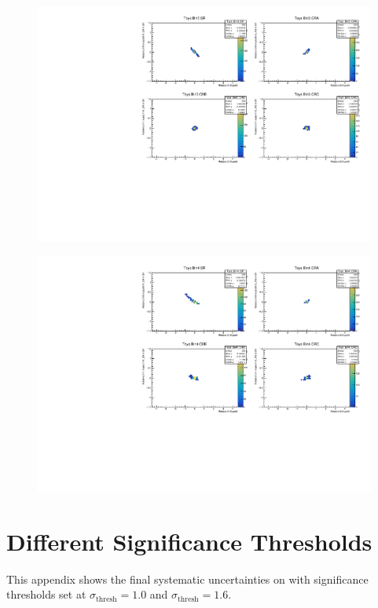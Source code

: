 \begin{figure}[H]
\includegraphics[width=\textwidth]{plots/diffx/instab/linearfx/instabilities_mjj_QCD_Sh2211_Signal_Sh2211_BSMCQCDSTATS_linearfx_newbinning_sherpaasimov_bin3.pdf}
\end{figure}
\begin{figure}[H]
\includegraphics[width=\textwidth]{plots/diffx/instab/linearfx/instabilities_mjj_QCD_Sh2211_Signal_Sh2211_BSMCQCDSTATS_linearfx_newbinning_sherpaasimov_bin4.pdf}
\end{figure}

\section{Different Significance Thresholds\label{sec:appendix:sigthresholds}}
This appendix shows the final systematic uncertainties on \new with significance thresholds set at $\sigma_{\text{thresh}}=1.0$ and $\sigma_{\text{thresh}}=1.6$.
